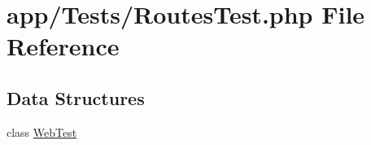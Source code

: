 \hypertarget{_routes_test_8php}{\section{app/\-Tests/\-Routes\-Test.php File Reference}
\label{_routes_test_8php}
}
\subsection*{Data Structures}
\begin{DoxyCompactItemize}
\item 
class \hyperlink{class_web_test}{Web\-Test}
\end{DoxyCompactItemize}
